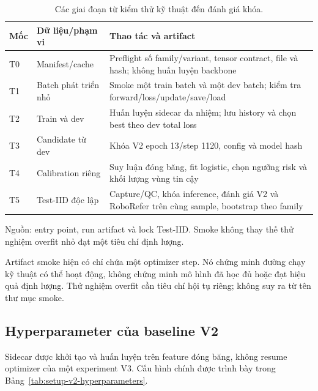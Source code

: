 \begin{table}[htbp]
    \centering
    \setlength{\tabcolsep}{4pt}
    \renewcommand{\arraystretch}{1.15}
    \caption{Các giai đoạn từ kiểm thử kỹ thuật đến đánh giá khóa.}
    \label{tab:setup-training-stages}
    \small
    \begin{tabularx}{\textwidth}{@{}l>{\raggedright\arraybackslash}p{}>{\raggedright\arraybackslash}X@{}}
        \toprule
        Mốc & Dữ liệu/phạm vi & Thao tác và artifact \\
        \midrule
        T0 & Manifest/cache &
        Preflight số family/variant, tensor contract,
        file và hash; không huấn luyện backbone \\
        T1 & Batch phát triển nhỏ &
        Smoke một train batch và một dev batch; kiểm
        tra forward/loss/update/save/load \\
        T2 & Train và dev &
        Huấn luyện sidecar đa nhiệm; lưu history và
        chọn best theo dev total loss \\
        T3 & Candidate từ dev &
        Khóa V2 epoch 13/step 1120, config và model hash \\
        T4 & Calibration riêng &
        Suy luận đóng băng, fit logistic, chọn ngưỡng
        risk và khối lượng vùng tin cậy \\
        T5 & Test-IID độc lập &
        Capture/QC, khóa inference, đánh giá V2 và
        RoboRefer trên cùng sample, bootstrap theo family \\
        \bottomrule
    \end{tabularx}
    \vspace{2pt}
    {\footnotesize\raggedright Nguồn: entry point, run artifact và lock
    Test-IID. Smoke không thay thế thử nghiệm overfit
    nhỏ đạt một tiêu chí định lượng.\par}
\end{table}

Artifact smoke hiện có chỉ chứa một optimizer step.
Nó chứng minh đường chạy kỹ thuật có thể hoạt động,
không chứng minh mô hình đã học đủ hoặc đạt hiệu quả
định lượng. Thử nghiệm overfit cần tiêu chí hội tụ
riêng; không suy ra từ tên thư mục smoke.

\subsection{Hyperparameter của baseline V2}

Sidecar được khởi tạo và huấn luyện trên feature đóng
băng, không resume optimizer của một experiment V3.
Cấu hình chính được trình bày trong
Bảng~\ref{tab:setup-v2-hyperparameters}.

